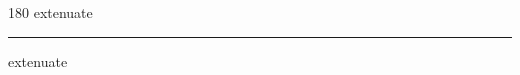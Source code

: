 
\begin{frame}
\begin{center}
\begin{turn}{180}
{\fontsize{2.5cm}{1em}\selectfont extenuate}
\end{turn}
\vspace{1em}\par  
\hrule
\vspace{1em}\par  
{\fontsize{2.5cm}{1em}\selectfont extenuate}
\end{center}
\end{frame}

